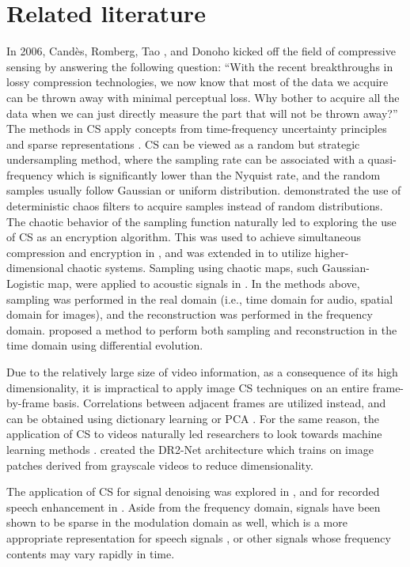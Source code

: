 \section{Related literature}
\label{sec:rrl}
In 2006, Cand\`{e}s, Romberg, Tao \cite{Candes2006}, and Donoho \cite{Donoho2006} kicked off the field of compressive sensing by answering the following question: ``With the recent breakthroughs in lossy compression technologies, we now know that most of the data we acquire can be thrown away with minimal perceptual loss. Why bother to acquire all the data when we can just directly measure the part that will not be thrown away?'' The methods in CS apply concepts from time-frequency uncertainty principles \cite{Donoho2001} and sparse representations \cite{Donoho2003}. CS can be viewed as a random but strategic undersampling method, where the sampling rate can be associated with a quasi-frequency which is significantly lower than the Nyquist rate, and the random samples usually follow Gaussian or uniform distribution. \cite{LinhTrung2008} demonstrated the use of deterministic chaos filters to acquire samples instead of random distributions. The chaotic behavior of the sampling function naturally led to exploring the use of CS as an encryption algorithm. This was used to achieve simultaneous compression and encryption in \cite{Mo2013}, and was extended in \cite{Zhou2016} to utilize higher-dimensional chaotic systems. Sampling using chaotic maps, such Gaussian-Logistic map, were applied to acoustic signals in \cite{Mathew2016}. In the methods above, sampling was performed in the real domain (i.e., time domain for audio, spatial domain for images), and the reconstruction was performed in the frequency domain. \cite{Andras2018} proposed a method to perform both sampling and reconstruction in the time domain using differential evolution.

Due to the relatively large size of video information, as a consequence of its high dimensionality, it is impractical to apply image CS techniques on an entire frame-by-frame basis. Correlations between adjacent frames are utilized instead, and can be obtained using dictionary learning \cite{Liu2013} or PCA \cite{Liu2014}. For the same reason, the application of CS to videos naturally led researchers to look towards machine learning methods \cite{Yao2019}. \cite{Iliadis2018} created the DR2-Net architecture which trains on image patches derived from grayscale videos to reduce dimensionality.

The application of CS for signal denoising was explored in \cite{Dabov2007}, and for recorded speech enhancement in \cite{Low2013}. Aside from the frequency domain, signals have been shown to be sparse in the modulation domain as well, which is a more appropriate representation for speech signals \cite{Low2018}, or other signals whose frequency contents may vary rapidly in time.


